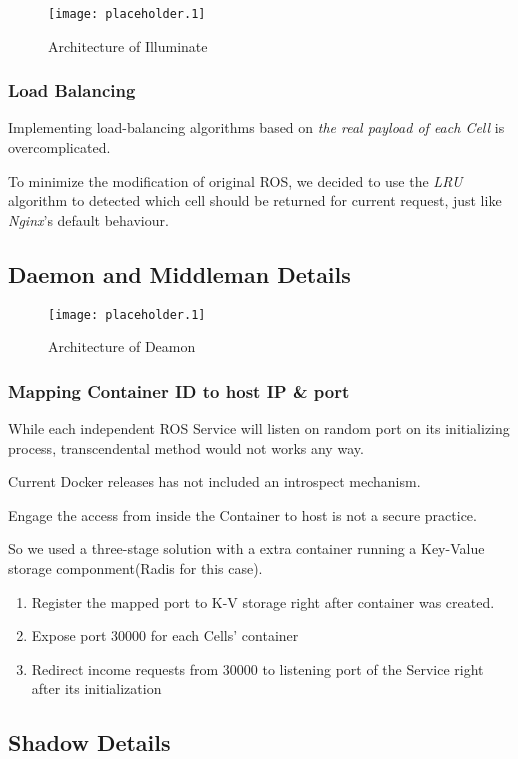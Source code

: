 \begin{figure}[h]
\centering
\texttt{[image: placeholder.1]}
\caption{Architecture of Illuminate}
\label{figure:illuminate}
\end{figure}

\subsubsection{Load Balancing}
Implementing load-balancing algorithms based on \emph{the real payload of each Cell} is overcomplicated.

To minimize the modification of original ROS, we decided to use the \emph{LRU} algorithm to detected which cell should be returned for current request, just like \emph{Nginx}'s default behaviour.

\subsection{Daemon and Middleman Details}

\begin{figure}[h]
\centering
\texttt{[image: placeholder.1]}
\caption{Architecture of Deamon}
\label{figure:illuminate}
\end{figure}

\subsubsection{Mapping Container ID to host IP \& port}
While each independent ROS Service will listen on random port on its initializing process,
transcendental method would not works any way. 

Current Docker releases has not included an introspect mechanism.

Engage the access from inside the Container to host is not a secure practice.

So we used a three-stage solution with a extra container running a Key-Value storage componment(Radis for this case).
\begin{enumerate}
    \item Register the mapped port to K-V storage right after container was created.
    \item Expose port 30000 for each Cells' container
    \item Redirect income requests from 30000 to listening port of the Service right after its initialization
\end{enumerate}

\subsection{Shadow Details}

